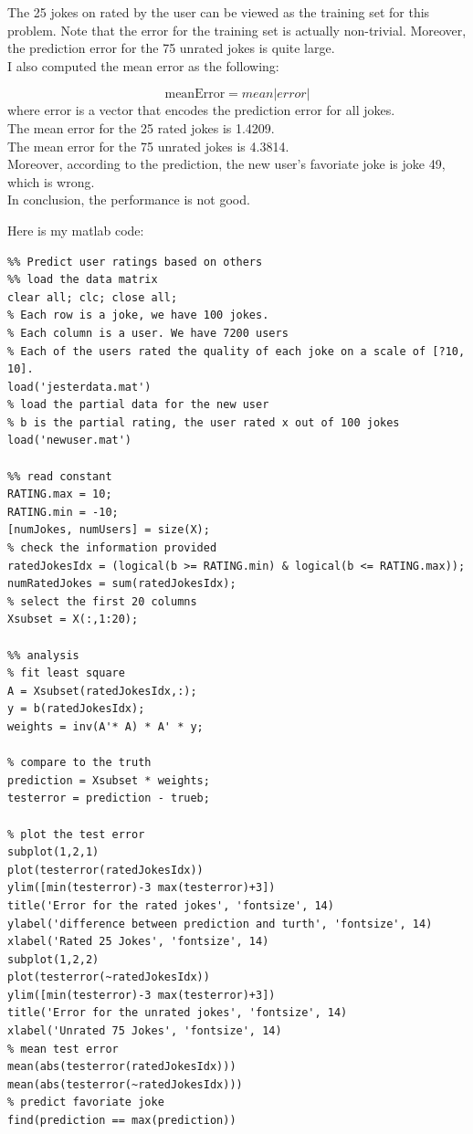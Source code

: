 \documentclass[paper=a4, fontsize=11pt]{scrartcl} %
\numberwithin{equation}{section} %
\numberwithin{figure}{section} %
\numberwithin{table}{section} %
\begin{document}
The 25 jokes on rated by the user can be viewed as the training set for this problem. Note that the error for the training set is actually non-trivial. Moreover, the prediction error for the 75 unrated jokes is quite large. \\

I also computed the mean error as the following: 

$$
\text{meanError} = mean|error|
$$
where error is a vector that encodes the prediction error for all jokes. \\

The mean error for the 25 rated jokes is 1.4209. \\
The mean error for the 75 unrated jokes is 4.3814. \\

Moreover, according to the prediction, the new user's favoriate joke is joke 49, which is wrong. \\

In conclusion, the performance is not good. 


\newpage
Here is my matlab code: 
\begin{lstlisting}
%% Predict user ratings based on others
%% load the data matrix
clear all; clc; close all; 
% Each row is a joke, we have 100 jokes.  
% Each column is a user. We have 7200 users 
% Each of the users rated the quality of each joke on a scale of [?10, 10].
load('jesterdata.mat')
% load the partial data for the new user 
% b is the partial rating, the user rated x out of 100 jokes
load('newuser.mat')

%% read constant 
RATING.max = 10;
RATING.min = -10;
[numJokes, numUsers] = size(X);
% check the information provided 
ratedJokesIdx = (logical(b >= RATING.min) & logical(b <= RATING.max)); 
numRatedJokes = sum(ratedJokesIdx);
% select the first 20 columns 
Xsubset = X(:,1:20);

%% analysis 
% fit least square 
A = Xsubset(ratedJokesIdx,:);
y = b(ratedJokesIdx);
weights = inv(A'* A) * A' * y;

% compare to the truth 
prediction = Xsubset * weights;
testerror = prediction - trueb;

% plot the test error 
subplot(1,2,1)
plot(testerror(ratedJokesIdx))
ylim([min(testerror)-3 max(testerror)+3])
title('Error for the rated jokes', 'fontsize', 14)
ylabel('difference between prediction and turth', 'fontsize', 14)
xlabel('Rated 25 Jokes', 'fontsize', 14)
subplot(1,2,2)
plot(testerror(~ratedJokesIdx))
ylim([min(testerror)-3 max(testerror)+3])
title('Error for the unrated jokes', 'fontsize', 14)
xlabel('Unrated 75 Jokes', 'fontsize', 14)
% mean test error 
mean(abs(testerror(ratedJokesIdx)))
mean(abs(testerror(~ratedJokesIdx)))
% predict favoriate joke
find(prediction == max(prediction))
\end{lstlisting}
\newpage
\end{document}
